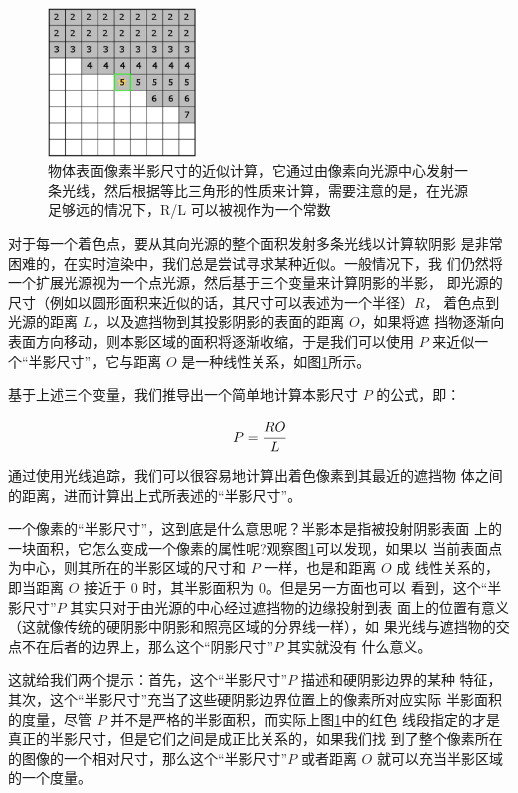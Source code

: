 \begin{figure}
\sidecaption
	\includegraphics[width=0.35\textwidth]{figures/shadows/penumbra-size-calculation-1}
	\caption{物体表面像素半影尺寸的近似计算，它通过由像素向光源中心发射一条光线，然后根据等比三角形的性质来计算，需要注意的是，在光源足够远的情况下，R/L 可以被视作为一个常数}
	\label{f:df-penumbra-size-calculation}
\end{figure}

对于每一个着色点，要从其向光源的整个面积发射多条光线以计算软阴影 是非常困难的，在实时渲染中，我们总是尝试寻求某种近似。一般情况下，我 们仍然将一个扩展光源视为一个点光源，然后基于三个变量来计算阴影的半影， 即光源的尺寸（例如以圆形面积来近似的话，其尺寸可以表述为一个半径）$R$， 着色点到光源的距离 $L$，以及遮挡物到其投影阴影的表面的距离 $O$，如果将遮 挡物逐渐向表面方向移动，则本影区域的面积将逐渐收缩，于是我们可以使用 $P$ 来近似一个“半影尺寸”，它与距离 $O$ 是一种线性关系，如图\ref{f:df-penumbra-size-calculation}所示。

基于上述三个变量，我们推导出一个简单地计算本影尺寸 $P$ 的公式，即：

\begin{equation}
	P=\cfrac{RO}{L}
\end{equation}

通过使用光线追踪，我们可以很容易地计算出着色像素到其最近的遮挡物 体之间的距离，进而计算出上式所表述的“半影尺寸”。

一个像素的“半影尺寸”，这到底是什么意思呢？半影本是指被投射阴影表面 上的一块面积，它怎么变成一个像素的属性呢?观察图\ref{f:df-penumbra-size-calculation}可以发现，如果以 当前表面点为中心，则其所在的半影区域的尺寸和 $P$ 一样，也是和距离 $O$ 成 线性关系的，即当距离 $O$ 接近于 0 时，其半影面积为 0。但是另一方面也可以 看到，这个“半影尺寸”$P$ 其实只对于由光源的中心经过遮挡物的边缘投射到表 面上的位置有意义（这就像传统的硬阴影中阴影和照亮区域的分界线一样），如 果光线与遮挡物的交点不在后者的边界上，那么这个“阴影尺寸”$P$ 其实就没有 什么意义。

这就给我们两个提示：首先，这个“半影尺寸”$P$ 描述和硬阴影边界的某种 特征，其次，这个“半影尺寸”充当了这些硬阴影边界位置上的像素所对应实际 半影面积的度量，尽管 $P$ 并不是严格的半影面积，而实际上图\ref{f:df-penumbra-size-calculation}中的红色 线段指定的才是真正的半影尺寸，但是它们之间是成正比关系的，如果我们找 到了整个像素所在的图像的一个相对尺寸，那么这个“半影尺寸”$P$ 或者距离 $O$ 就可以充当半影区域的一个度量。


